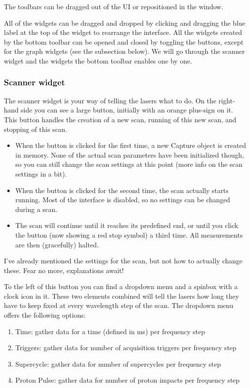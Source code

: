 \documentclass[10pt,a4paper]{article}
\begin{document}
The toolbars can be dragged out of the UI or repositioned in the window.

All of the widgets can be dragged and dropped by clicking and dragging the blue label at the top of the widget to rearrange the interface. All the widgets created by the bottom toolbar can be opened and closed by toggling the buttons, except for the graph widgets (see the subsection below). We will go through the scanner widget and the widgets the bottom toolbar enables one by one.

\subsubsection{Scanner widget}

The scanner widget is your way of telling the lasers what to do. On the right-hand side you can see a large button, initially with an orange plus-sign on it. This button handles the creation of a new scan, running of this new scan, and stopping of this scan. 

\begin{itemize}
    \item When the button is clicked for the first time, a new Capture object is created in memory. None of the actual scan parameters have been initialized though, so you can still change the scan settings at this point (more info on the scan settings in a bit). 
    \item When the button is clicked for the second time, the scan actually starts running. Most of the interface is disabled, so no settings can be changed during a scan.
    \item The scan will continue until it reaches its predefined end, or until you click the button (now showing a red stop symbol) a third time. All measurements are then (gracefully) halted.
\end{itemize}


I've already mentioned the settings for the scan, but not how to actually change these. Fear no more, explanations await!

To the left of this button you can find a dropdown menu and a spinbox with a clock icon in it. These two elements combined will tell the lasers how long they have to keep fixed at every wavelength step of the scan. The dropdown menu offers the following options:
\begin{enumerate}
    \item Time: gather data for a time (defined in ms) per frequency step
    \item Triggers: gather data for number of acquisition triggers per frequency step
    \item Supercycle: gather data for number of supercycles per frequency step
    \item Proton Pulse: gather data for number of proton impacts per frequency step
\end{enumerate}
\end{document}
